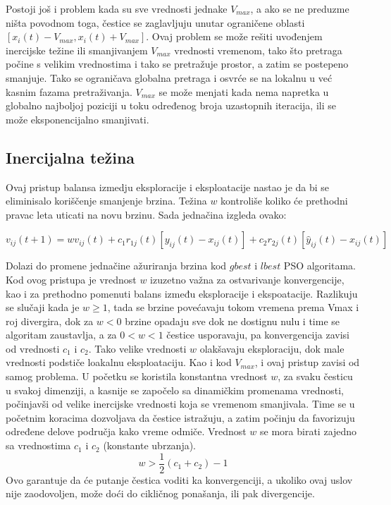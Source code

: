 \documentclass[a4paper]{article}
\begin{document}
Postoji još i problem kada su sve vrednosti jednake $V_{max}$, a ako se ne preduzme ništa povodnom toga, čestice se zaglavljuju unutar ograničene oblasti $[x_i(t)-V_{max} , x_i(t) + V_{max} ]$.  Ovaj problem se može rešiti uvođenjem inercijske težine ili smanjivanjem  $V_{max}$ vrednosti vremenom, tako što pretraga počine s velikim vrednostima i tako se pretražuje prostor, a zatim se postepeno smanjuje. Tako se ograničava globalna pretraga i osvrće se na lokalnu u već kasnim fazama pretraživanja. $V_{max}$ se može menjati kada nema napretka u globalno najboljoj poziciji u toku određenog broja uzastopnih iteracija, ili se može eksponencijalno smanjivati.

\subsection{Inercijalna težina}
Ovaj pristup balansa izmedju eksploracije i eksploatacije nastao je da bi se eliminisalo koriščenje smanjenje brzina. Težina $w$  kontroliše koliko će prethodni pravac leta uticati na novu brzinu. Sada jednačina izgleda ovako:

\[v_{ij}(t+1) = wv_{ij}(t) + c_1r_{1j}(t)[y_{ij}(t) - x_{ij}(t)] + c_2r_{2j}(t)[\hat{y}_{ij}(t) - x_{ij}(t)] \]

Dolazi do promene jednačine ažuriranja brzina kod $gbest$ i $lbest$ PSO algoritama.
Kod ovog pristupa je vrednost $w$ izuzetno važna za ostvarivanje konvergencije, kao i za prethodno pomenuti balans između eksploracije i ekspoatacije. Razlikuju se slučaji kada je $w \geq 1$, tada se brzine povećavaju tokom vremena prema Vmax i roj divergira, dok za $w < 0$ brzine opadaju sve dok ne dostignu nulu i time se algoritam zaustavlja, a za $0 < w < 1$ čestice usporavaju, pa konvergencija zavisi od vrednosti $c_1$ i $c_2$. Tako velike vrednosti  $w$ olakšavaju eksploraciju, dok male vrednosti podstiče loakalnu eksploataciju. 
Kao i kod $V_{max}$, i ovaj pristup zavisi od samog problema. U početku se koristila konstantna vrednost $w$, za svaku česticu u svakoj dimenziji, a kasnije se započelo sa dinamičkim promenama vrednosti, počinjavši od velike inercijske vrednosti koja se vremenom smanjivala. Time se u početnim koracima dozvoljava da čestice istražuju, a zatim počinju da favorizuju određene delove područja kako vreme odmiče.
Vrednost $w$ se mora birati zajedno sa vrednostima $c_1$ i $c_2$ (konstante ubrzanja). $$w > \frac{1}{2}(c_1 + c_2) - 1$$ Ovo garantuje da će putanje čestica voditi ka konvergenciji, a ukoliko ovaj uslov nije zaodovoljen, može doći do cikličnog ponašanja, ili pak divergencije.
\end{document}
